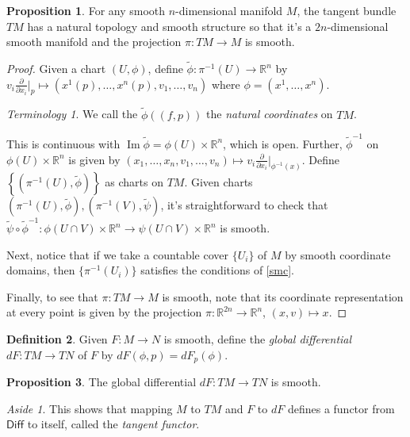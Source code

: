 \documentclass[10pt,letterpaper,cm]{nupset}
\theoremstyle{definition}
\newtheorem{definition}{Definition}[subsection]
\theoremstyle{theorem}
\newtheorem{prop}[definition]{Proposition}
\theoremstyle{remark}
\newtheorem*{aside}{Aside}
\newtheorem*{term}{Terminology}
\DeclareMathOperator{\Ima}{Im}
\newcommand{\R}{\mathbb R}
\newcommand{\1}{\mathbf{1}}
\newcommand{\0}{\vec 0}
\begin{document}
\begin{prop}
For any smooth $n$-dimensional manifold $M$, the tangent bundle $TM$ has a natural topology and smooth structure so that it's a $2n$-dimensional smooth manifold and the projection $\pi : TM \to M$ is smooth.
\end{prop}
\begin{proof}
Given a chart $(U, \phi)$, define $\tilde{\phi}: \pi^{-1}(U) \to \R^n$ by $v_i\frac{\partial}{\partial{x_i}}\bigr\rvert_p \mapsto (x^1(p), \ldots, x^n(p), v_1, \ldots, v_n)$ where $\phi = (x^1, \ldots, x^n)$. 
\begin{term}
We call the $\tilde{\phi}\left((f, p)\right)$ the \textit{natural coordinates} on $TM$.
\end{term}
This is continuous with $\Ima \tilde{\phi} = \phi(U) \times \R^n$, which is open. Further, $\tilde{\phi}^{-1}$ on $\phi(U) \times \R^n$ is given by $(x_1, \ldots, x_n, v_1, \ldots, v_n)\mapsto v_i \frac{\partial}{\partial{x_i}}\bigr\rvert_{\phi^{-1}(x)}$. Define $\left\{(\pi^{-1}(U), \tilde{\phi})\right\}$ as charts on $TM$. Given charts $(\pi^{-1}(U), \tilde{\phi}), (\pi^{-1}(V), \tilde{\psi})$, it's straightforward to check that $\tilde{\psi} \circ \tilde{\phi}^{-1}: \phi(U \cap V)\times \R^n \to \psi(U \cap V)\times \R^n$ is smooth.

\medskip


Next, notice that if we take a countable cover $\{U_i\}$ of $M$ by smooth coordinate domains, then $\{\pi^{-1}(U_i)\}$ satisfies the conditions of \cref{smc}.

\medskip


Finally, to see that $\pi : TM \to M$ is smooth, note that its coordinate representation at every point is given by the projection $\pi:\R^{2n} \to \R^n$, $(x,v) \mapsto x$.
\end{proof}

\begin{definition}
Given $F: M \to N$ is smooth, define the \textit{global differential} $dF: TM \to TN$ of $F$ by $dF(\phi, p) = dF_p(\phi)$.
\end{definition}

\begin{prop}
The global differential $dF: TM \to TN$ is smooth.
\end{prop}

\begin{aside}
This shows that mapping $M$ to $TM$ and $F$ to $dF$ defines a functor from $\mathsf{Diff}$ to itself, called the \textit{tangent functor}.
\end{aside}
\end{document}
